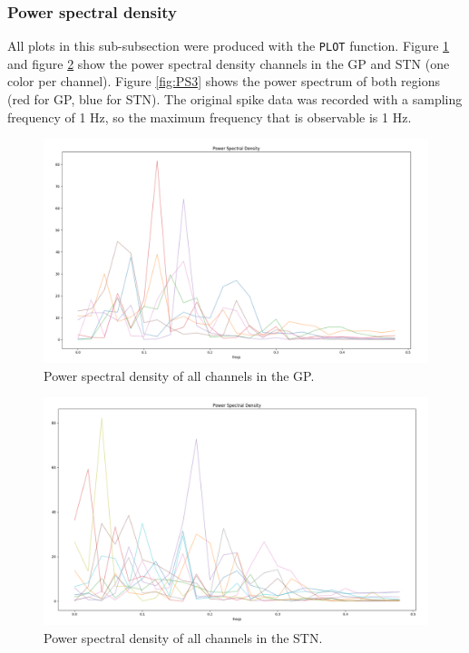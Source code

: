 \documentclass{article}
\begin{document}
\subsubsection{Power spectral density}

All plots in this sub-subsection were produced with the \texttt{PLOT} function.
Figure \ref{fig:PS1} and figure \ref{fig:PS2} show the power spectral density channels in the GP and STN (one color per channel). 
Figure \ref{fig:PS3} shows the power spectrum of both regions (red for GP, blue for STN).
The original spike data was recorded with a sampling frequency of 1 Hz, so the maximum frequency that is observable is 1 Hz.

\begin{figure}[H]
    \centering
    \centerline{\includegraphics[width=1\textwidth]{images/spiking/powerSpec_gp.png}}
    \caption{Power spectral density of all channels in the GP.}
    \label{fig:PS1}
\end{figure}

\begin{figure}[H]
    \centering
    \centerline{\includegraphics[width=1\textwidth]{images/spiking/powerSpect_stn.png}}
    \caption{Power spectral density of all channels in the STN.}
    \label{fig:PS2}
\end{figure}
\end{document}
